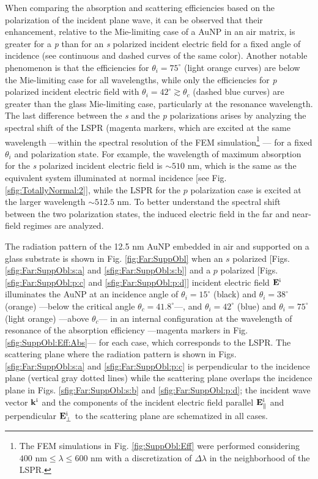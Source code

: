 When comparing the absorption and scattering efficiencies based on the polarization of the incident plane wave, it can be observed that their enhancement, relative to the Mie-limiting case of a AuNP in an air matrix, is greater for a  \textit{p} than for an \textit{s} polarized incident electric field for a fixed angle of incidence (see continuous and dashed curves of the same color). Another notable phenomenon is that the  efficiencies for $\theta_i=75^\circ$ (light orange curves)  are below the Mie-limiting case for all wavelengths, while only the efficiencies for  \textit{p} polarized incident electric field with $\theta_i = 42^\circ \gtrsim \theta_c$ (dashed blue curves) are greater than the glass Mie-limiting case, particularly at the resonance wavelength. The last difference between the \textit{s} and the \textit{p} polarizations arises by analyzing the spectral shift of the LSPR (magenta markers, which are excited at the same wavelength ---within the spectral resolution of the FEM simulation\footnote{
	The FEM simulations in Fig. \ref{fig:SuppObl:Eff} were performed considering $400\text{ nm}\leq \lambda \leq 600 \text{ nm}$ with a discretization of $\Delta \lambda$ in the neighborhood of the LSPR.}%
--- for a fixed $\theta_i$ and polarization state. For example, the wavelength of maximum absorption for the \textit{s} polarized incident electric field is $\sim 510$ nm, which is the same as the equivalent system illuminated at normal incidence [see Fig. \ref{sfig:TotallyNormal:2}], while the LSPR for the $p$ polarization case is excited at the larger wavelength $\sim 512.5$ nm. To better understand the spectral shift between the two polarization states, the induced electric field in the far and near-field regimes are analyzed.

The radiation pattern of the 12.5 nm AuNP embedded in air and supported on a glass substrate is shown in Fig. \ref{fig:Far:SuppObl} when an $s$ polarized [Figs. \ref{sfig:Far:SuppObl:s:a} and \ref{sfig:Far:SuppObl:s:b}] and a  $p$ polarized [Figs. \ref{sfig:Far:SuppObl:p:c} and \ref{sfig:Far:SuppObl:p:d}] incident electric field $\vb{E}^\text{i}$ illuminates the AuNP at an incidence angle of $\theta_i = 15^\circ$ (black) and $\theta_i = 38^\circ$ (orange) ---below the critical angle $\theta_c = 41.8^\circ$---, and $\theta_i = 42^\circ$ (blue) and $\theta_i = 75^\circ$ (light orange) ---above  $\theta_c$--- in an internal configuration at the wavelength of resonance of the absorption efficiency ---magenta markers in Fig. \ref{sfig:SuppObl:Eff:Abs}--- for each case, which corresponds to the LSPR. The scattering plane where the radiation pattern is shown in Figs. \ref{sfig:Far:SuppObl:s:a} and \ref{sfig:Far:SuppObl:p:c}  is perpendicular to the incidence plane (vertical gray dotted lines) while the scattering plane overlaps the incidence plane in Figs. \ref{sfig:Far:SuppObl:s:b} and \ref{sfig:Far:SuppObl:p:d}; the incident wave vector $\vb{k}^\text{i}$ and the components of the incident electric field parallel $\vb{E}^\text{i}_\parallel$ and perpendicular $\vb{E}^\text{i}_\perp$ to the scattering plane are schematized in all cases.

